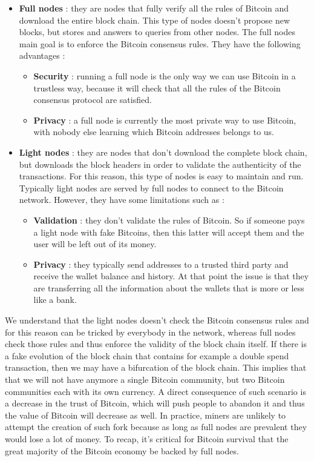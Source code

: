 \begin{itemize}
\item \textbf{Full nodes} : they are nodes that fully verify all the rules of Bitcoin and download the entire block chain. This type of nodes doesn't propose new blocks, but stores and answers to queries from other nodes. The full nodes main goal is to enforce the Bitcoin consensus rules. They have the following advantages :
\begin{itemize}
\item \textbf{Security} : running a full node is the only way we can use Bitcoin in a trustless way, because it will check that all the rules of the Bitcoin consensus protocol are satisfied.
\item \textbf{Privacy} : a full node is currently the most private way to use Bitcoin, with nobody else learning which Bitcoin addresses belongs to us.
\end{itemize}
\item \textbf{Light nodes} : they are nodes that don't download the complete block chain, but downloads the block headers in order to validate the authenticity of the transactions. For this reason, this type of nodes is easy to maintain and run. Typically light nodes are served by full nodes to connect to the Bitcoin network. However, they have some limitations such as :
\begin{itemize}
\item \textbf{Validation} : they don't validate the rules of Bitcoin. So if someone pays a light node with fake Bitcoins, then this latter will accept them and the user will be left out of its money.
\item \textbf{Privacy} : they typically send addresses to a trusted third party and receive the wallet balance and history. At that point the issue is that they are transferring all the information about the wallets that is more or less like a bank.
\end{itemize}
\end{itemize}
We understand that the light nodes doesn't check the Bitcoin consensus rules and for this reason can be tricked by everybody in the network, whereas full nodes check those rules and thus enforce the validity of the block chain itself. If there is a fake evolution of the block chain that contains for example a double spend transaction, then we may have a bifurcation of the block chain. This implies that that we will not have anymore a single Bitcoin community, but two Bitcoin communities each with its own currency. A direct consequence of such scenario is a decrease in the trust of Bitcoin, which will push people to abandon it and thus the value of Bitcoin will decrease as well. In practice, miners are unlikely to attempt the creation of such fork because as long as full nodes are prevalent they would lose a lot of money. To recap, it's critical for Bitcoin survival that the great majority of the Bitcoin economy be backed by full nodes.

